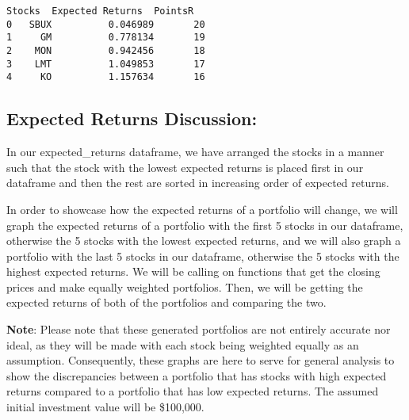 \documentclass[11pt]{article}
\makeatletter
\newcommand{\boxspacing}{\kern\kvtcb@left@rule\kern\kvtcb@boxsep}
\newcommand{\prompt}[4]{
        {\ttfamily\llap{{\color{#2}[#3]:\hspace{3pt}#4}}\vspace{-\baselineskip}}
    }
\makeatother
\begin{document}
            \begin{tcolorbox}[breakable, size=fbox, boxrule=.5pt, pad at break*=1mm, opacityfill=0]
\prompt{Out}{outcolor}{14}{\boxspacing}
\begin{Verbatim}[commandchars=\\\{\}]
  Stocks  Expected Returns  PointsR
0   SBUX          0.046989       20
1     GM          0.778134       19
2    MON          0.942456       18
3    LMT          1.049853       17
4     KO          1.157634       16
\end{Verbatim}
\end{tcolorbox}
        
    \hypertarget{expected-returns-discussion}{%
\subsection{Expected Returns
Discussion:}\label{expected-returns-discussion}}

In our expected\_returns dataframe, we have arranged the stocks in a
manner such that the stock with the lowest expected returns is placed
first in our dataframe and then the rest are sorted in increasing order
of expected returns.

In order to showcase how the expected returns of a portfolio will
change, we will graph the expected returns of a portfolio with the first
5 stocks in our dataframe, otherwise the 5 stocks with the lowest
expected returns, and we will also graph a portfolio with the last 5
stocks in our dataframe, otherwise the 5 stocks with the highest
expected returns. We will be calling on functions that get the closing
prices and make equally weighted portfolios. Then, we will be getting
the expected returns of both of the portfolios and comparing the two.

\textbf{Note}: Please note that these generated portfolios are not
entirely accurate nor ideal, as they will be made with each stock being
weighted equally as an assumption. Consequently, these graphs are here
to serve for general analysis to show the discrepancies between a
portfolio that has stocks with high expected returns compared to a
portfolio that has low expected returns. The assumed initial investment
value will be \$100,000.
\end{document}
